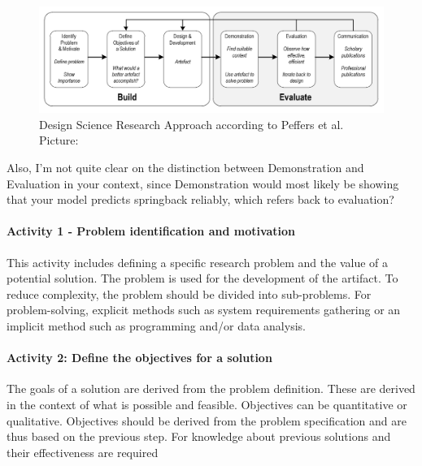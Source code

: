 \begin{figure}[H]
    \begin{tcolorbox}[arc=0pt,boxrule=0.5pt]
        \centering
        \includegraphics[width=1\linewidth]{chap3/images/dsr_process.png}
        \caption[DSR Process]{Design Science Research Approach according to Peffers et al.
        Picture: \cite[p. 72]{sonnenberg_evaluationpatternsdesign_2012}}
        \label{fig:dsr_process}
    \end{tcolorbox}
\end{figure}


Also, I’m not quite clear on the distinction between Demonstration and Evaluation in your
context, since Demonstration would most likely be showing that your model predicts springback
reliably, which refers back to evaluation?

\paragraph{Activity 1 - Problem identification and motivation}
This activity includes defining a specific research problem and the value of a potential solution.
The problem is used for the development of the artifact. To reduce complexity, the problem should
be divided into sub-problems. For problem-solving, explicit methods such as system requirements
gathering or an implicit method such as programming and/or data analysis.
\cite[p. 52]{peffers_designscienceresearch_2007}

\paragraph{Activity 2: Define the objectives for a solution}
The goals of a solution are derived from the problem definition. These are derived in the context
of what is possible and feasible.
Objectives can be quantitative or qualitative. Objectives should be derived from the
problem specification and are thus based on the previous step.
For knowledge about previous solutions and their effectiveness are required
\cite[p. 55]{peffers_designscienceresearch_2007}

